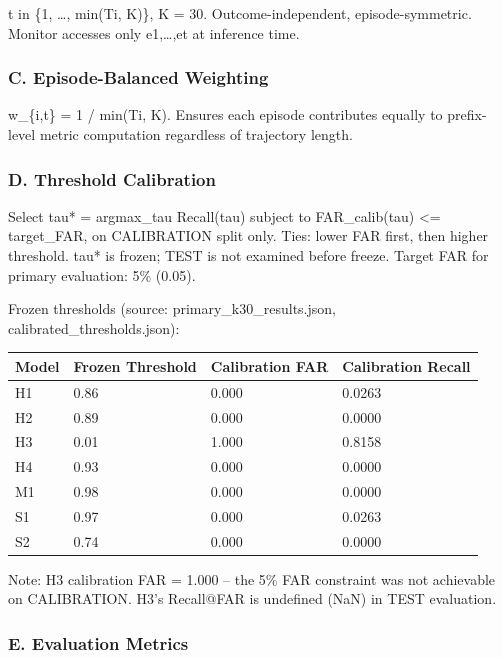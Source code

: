 \documentclass[
]{article}
\newcounter{none} %
\begin{document}
t in \{1, \ldots, min(Ti, K)\}, K = 30. Outcome-independent,
episode-symmetric. Monitor accesses only e1,\ldots,et at inference time.

\subsubsection{C. Episode-Balanced
Weighting}\label{c.-episode-balanced-weighting}

w\_\{i,t\} = 1 / min(Ti, K). Ensures each episode contributes equally to
prefix-level metric computation regardless of trajectory length.

\subsubsection{D. Threshold Calibration}\label{d.-threshold-calibration}

Select tau* = argmax\_tau Recall(tau) subject to FAR\_calib(tau)
\textless= target\_FAR, on CALIBRATION split only. Ties: lower FAR
first, then higher threshold. tau* is frozen; TEST is not examined
before freeze. Target FAR for primary evaluation: 5\% (0.05).

Frozen thresholds (source: primary\_k30\_results.json,
calibrated\_thresholds.json):

{\def\LTcaptype{none} %
\begin{longtable}[]{@{}llll@{}}
\toprule\noalign{}
Model & Frozen Threshold & Calibration FAR & Calibration Recall \\
\midrule\noalign{}
\endhead
\bottomrule\noalign{}
\endlastfoot
H1 & 0.86 & 0.000 & 0.0263 \\
H2 & 0.89 & 0.000 & 0.0000 \\
H3 & 0.01 & 1.000 & 0.8158 \\
H4 & 0.93 & 0.000 & 0.0000 \\
M1 & 0.98 & 0.000 & 0.0000 \\
S1 & 0.97 & 0.000 & 0.0263 \\
S2 & 0.74 & 0.000 & 0.0000 \\
\end{longtable}
}

Note: H3 calibration FAR = 1.000 -- the 5\% FAR constraint was not
achievable on CALIBRATION. H3's Recall@FAR is undefined (NaN) in TEST
evaluation.

\subsubsection{E. Evaluation Metrics}\label{e.-evaluation-metrics}
\end{document}
